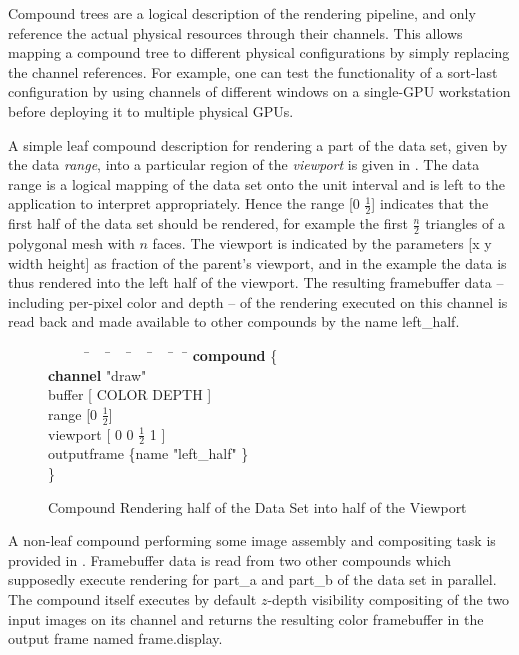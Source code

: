 Compound trees are a logical description of the rendering pipeline, and only
reference the actual physical resources through their channels. This allows
mapping a compound tree to different physical configurations by simply
replacing the channel references. For example, one can test the functionality
of a sort-last configuration by using channels of different windows on a
single-GPU workstation before deploying it to multiple physical GPUs.

A simple leaf compound description for rendering a part of the data set, given
by the data {\em range}, into a particular region of the {\em viewport} is
given in . The data range is a logical mapping of the
data set onto the unit interval and is left to the application to interpret
appropriately. Hence the range [0 $\frac{1}{2}$] indicates that the first half
of the data set should be rendered, for example the first $\frac{n}{2}$
triangles of a polygonal mesh with $n$ faces. The viewport is indicated by the
parameters [x y width height] as fraction of the parent's viewport, and in the
example the data is thus rendered into the left half of the viewport. The
resulting framebuffer data -- including per-pixel color and depth -- of the
rendering executed on this channel is read back and made available to other
compounds by the name left\_half.

\begin{figure}[h!t]\center
 {\begin{tabbing} \ \ \ \ \ \=\ \ \ \=\ \ \ \=\ \ \ \=\ \ \ \=\ \ \ \= \kill
   \> {\bf compound} \{						\\
   \>\> {\bf channel} "draw"					\\
   \>\> buffer  [ COLOR DEPTH ]				\\
   \>\> range [0 $\frac{1}{2}$]				\\
   \>\> viewport [ 0 0 $\frac{1}{2}$ 1 ]                 \\
   \>\> outputframe \{name "left\_half" \}	\\
   \> \}
  \end{tabbing}}
 \vspace{-2mm}
 \caption{Compound Rendering half of the Data Set into half of the Viewport\label{FIG_leaf_compound}}
\end{figure}

A non-leaf compound performing some image assembly and compositing task is
provided in . Framebuffer data is read from two other
compounds which supposedly execute rendering for part\_a and part\_b of the data
set in parallel. The compound itself executes by default $z$-depth visibility
compositing of the two input images on its channel and returns the resulting
color framebuffer in the output frame named frame.display.

